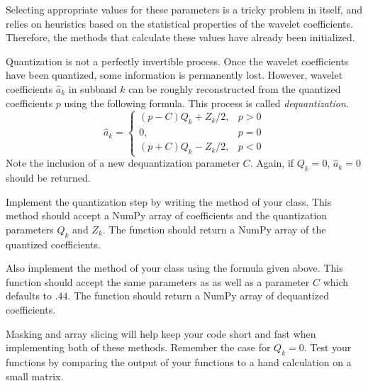 Selecting appropriate values for these parameters is a tricky problem in itself, and relies on heuristics based on the statistical properties of the wavelet coefficients.
Therefore, the methods that calculate these values have already been initialized.

Quantization is not a perfectly invertible process.
Once the wavelet coefficients have been quantized, some information is permanently lost.
However, wavelet coefficients $\hat{a}_k$ in subband $k$ can be roughly reconstructed from the quantized coefficients $p$ using the following formula.
This process is called \emph{dequantization}.
\[
\hat{a}_k =
\begin{cases}
(p-C)Q_k + Z_k/2, & p> 0\\
0, & p = 0\\
(p + C)Q_k - Z_k/2, & p < 0
\end{cases}
\]
Note the inclusion of a new dequantization parameter $C$.
Again, if $Q_k = 0$, $\hat{a}_k = 0$ should be returned.

\begin{problem}
Implement the quantization step by writing the  method of your class.
This method should accept a NumPy array of coefficients and the quantization parameters $Q_k$ and $Z_k$.
The function should return a NumPy array of the quantized coefficients.

Also implement the  method of your class using the formula given above.
This function should accept the same parameters as  as well as a parameter $C$ which defaults to $.44$.
The function should return a NumPy array of dequantized coefficients.

Masking and array slicing will help keep your code short and fast when implementing both of these methods.
Remember the case for $Q_k=0$.
Test your functions by comparing the output of your functions to a hand calculation on a small matrix.
\end{problem}

